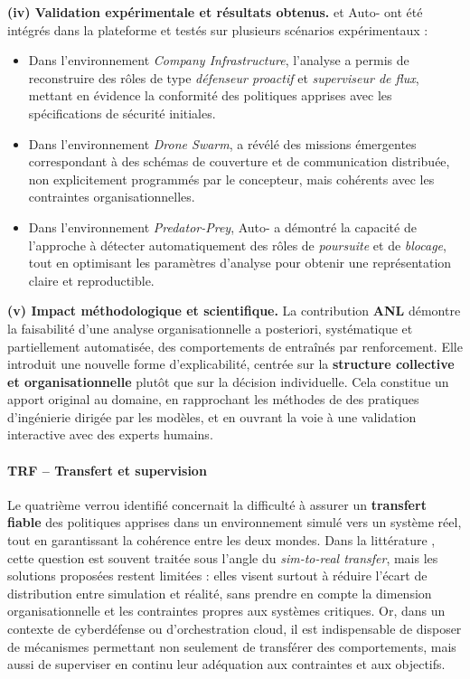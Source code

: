 \medskip
\noindent
\textbf{(iv) Validation expérimentale et résultats obtenus.}
 et Auto- ont été intégrés dans la plateforme  et testés sur plusieurs scénarios expérimentaux :
\begin{itemize}
  \item Dans l’environnement \textit{Company Infrastructure}, l’analyse a permis de reconstruire des rôles de type \textit{défenseur proactif} et \textit{superviseur de flux}, mettant en évidence la conformité des politiques apprises avec les spécifications de sécurité initiales.
  \item Dans l’environnement \textit{Drone Swarm},  a révélé des missions émergentes correspondant à des schémas de couverture et de communication distribuée, non explicitement programmés par le concepteur, mais cohérents avec les contraintes organisationnelles.
  \item Dans l’environnement \textit{Predator-Prey}, Auto- a démontré la capacité de l’approche à détecter automatiquement des rôles de \textit{poursuite} et de \textit{blocage}, tout en optimisant les paramètres d’analyse pour obtenir une représentation claire et reproductible.
\end{itemize}

\medskip
\noindent
\textbf{(v) Impact méthodologique et scientifique.}
La contribution \textbf{ANL} démontre la faisabilité d’une analyse organisationnelle a posteriori, systématique et partiellement automatisée, des comportements de  entraînés par renforcement.
Elle introduit une nouvelle forme d’explicabilité, centrée sur la \textbf{structure collective et organisationnelle} plutôt que sur la décision individuelle.
Cela constitue un apport original au domaine, en rapprochant les méthodes de  des pratiques d’ingénierie dirigée par les modèles, et en ouvrant la voie à une validation interactive avec des experts humains.

\paragraph{TRF – Transfert et supervision}

Le quatrième verrou identifié concernait la difficulté à assurer un \textbf{transfert fiable} des politiques apprises dans un environnement simulé vers un système réel, tout en garantissant la cohérence entre les deux mondes.
Dans la littérature , cette question est souvent traitée sous l’angle du \textit{sim-to-real transfer}, mais les solutions proposées restent limitées :
elles visent surtout à réduire l’écart de distribution entre simulation et réalité, sans prendre en compte la dimension organisationnelle et les contraintes propres aux systèmes critiques.
Or, dans un contexte de cyberdéfense ou d’orchestration cloud, il est indispensable de disposer de mécanismes permettant non seulement de transférer des comportements, mais aussi de superviser en continu leur adéquation aux contraintes et aux objectifs.

